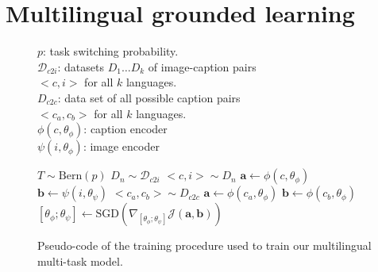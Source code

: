 \section{Multilingual grounded learning}
\begin{figure}
\begin{algorithmic}

\Require $p$: task switching probability.\\

$\mathcal{D}_{c2i}$: datasets $D_1 \dots D_k$ of image-caption pairs \\\hspace{2.5em}$<c, i>$ for all $k$ languages.\\

$D_{c2c}$: data set of all possible caption pairs \\\hspace{2.5em}$<c_a, c_b>$ for all $k$ languages. \\

 $\phi (c, \theta_\phi)$: caption encoder\\
$\psi (i, \theta_\phi)$: image encoder
\State
{}

  \State  $T \sim \text{Bern}(p)$
  	  \State $D_n \sim \mathcal{D}_{c2i}$
      \State $<c, i> \sim D_n$
      \State $\mathbf{a} \gets \phi (c, \theta_\phi)$
      \State $\mathbf{b} \gets \psi (i, \theta_\psi)$
  \Else
      \State $<c_a, c_b> \sim D_{c2c}$
      \State $\mathbf{a} \gets \phi (c_a, \theta_\phi)$
      \State $\mathbf{b} \gets \phi (c_b, \theta_\phi)$
  \EndIf
  \State $[\theta_\phi; \theta_\psi] \gets \text{SGD}(\nabla_{[\theta_\phi; \theta_\psi]} \mathcal{J}(\mathbf{a}, \mathbf{b}))$
\EndWhile
\end{algorithmic}
\caption{Pseudo-code of the training procedure used to train our multilingual multi-task model.}
\label{fig:algo}
\end{figure}


